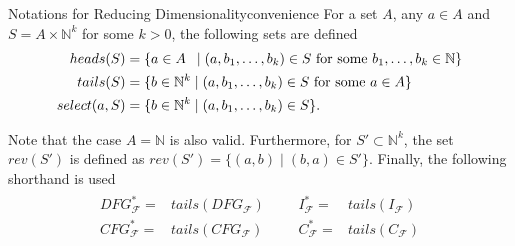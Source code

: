 \begin{definition}{Notations for Reducing Dimensionality}{convenience}
    For a set $A$, any $a\in A$ and $S=A\times\mathbb N^k$ for some $k>0$, the
    following sets are defined
    \begin{align*}
        heads(S)={}&\{a\in A\hspace{1.8mm}\mid(a,b_1,\dots,b_k)\in S\text{ for some }b_1,\dots,b_k\in\mathbb N\}\\
        tails(S)={}&\{b\in\mathbb N^k\mid(a,b_1,\dots,b_k)\in S\text{ for some }a\in A\}\\
        select(a,S)={}&\{b\in\mathbb N^k\mid(a,b_1,\dots,b_k)\in S\}.
    \end{align*}

    Note that the case $A=\mathbb N$ is also valid.
    Furthermore, for $S'\subset\mathbb N^k$, the set $rev(S')$ is defined as
    $rev(S')=\{(a,b)\mid(b,a)\in S'\}$.
    Finally, the following shorthand is used
    \begin{align*}
        \begin{aligned}
        DFG_\mathcal F^*={}&tails(DFG_\mathcal F)\\
        CFG_\mathcal F^*={}&tails(CFG_\mathcal F)
        \end{aligned}&&
        \begin{aligned}
        I_\mathcal F^*={}&tails(I_\mathcal F)\\
        C_\mathcal F^*={}&tails(C_\mathcal F)
        \end{aligned}
    \end{align*}
\end{definition}